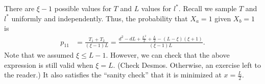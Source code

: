\documentclass{article}
\begin{document}
There are $\xi - 1$ possible values for $T$ and $L$ values for $l^*$.
Recall we sample $T$ and $l^*$ uniformly and independently.
Thus, the probability that $X_a = 1$ given $X_b = 1$ is
\begin{align}
  p_{11}
  &= \frac{T_1 + T_2}{(\xi - 1) L}
  = \frac{ d^2 - dL + \frac{L^2}{2} + \frac{L}{2} - (L-\xi) (\xi+1) }{ (\xi - 1) L }.
\end{align}
Note that we assumed $\xi \leq L-1$.
However, we can check that the above expression is still valid when $\xi = L$.
(Check Desmos. Otherwise, an exercise left to the reader.)
It also satisfies the ``sanity check'' that it is minimized at $x = \frac{L}{2}$.
\end{document}
